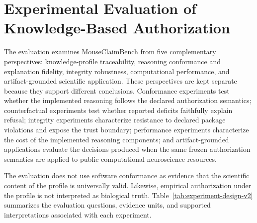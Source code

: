 \documentclass[11pt,a4paper]{article}
\begin{document}
\section{Experimental Evaluation of Knowledge-Based Authorization}
\label{sec:experiments}
The evaluation examines MouseClaimBench from five complementary perspectives: knowledge-profile traceability, reasoning conformance and explanation fidelity, integrity robustness, computational performance, and artifact-grounded scientific application. These perspectives are kept separate because they support different conclusions. Conformance experiments test whether the implemented reasoning follows the declared authorization semantics; counterfactual experiments test whether reported deficits faithfully explain refusal; integrity experiments characterize resistance to declared package violations and expose the trust boundary; performance experiments characterize the cost of the implemented reasoning components; and artifact-grounded applications evaluate the decisions produced when the same frozen authorization semantics are applied to public computational neuroscience resources.

The evaluation does not use software conformance as evidence that the scientific content of the profile is universally valid. Likewise, empirical authorization under the profile is not interpreted as biological truth. Table~\ref{tab:experiment-design-v2} summarizes the evaluation questions, evidence units, and supported interpretations associated with each experiment.
\end{document}

